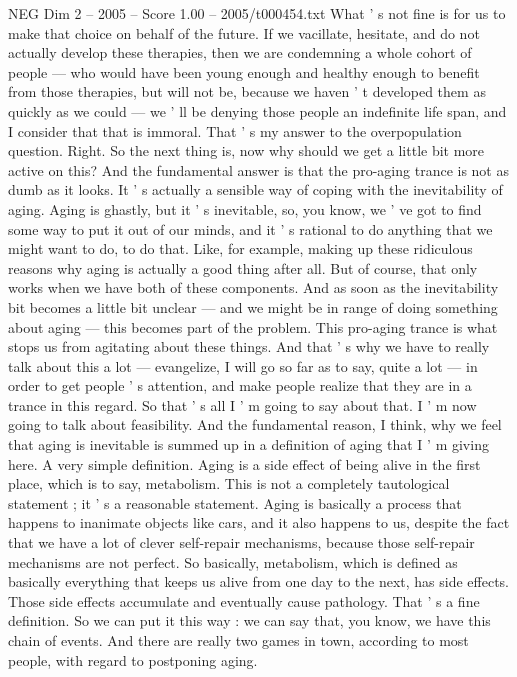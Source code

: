 \begin{textsample}{NEG Dim 2 – 2005 – Score 1.00 – 2005/t000454.txt}
What ' s not fine is for us to make that choice on behalf of the future.
If we vacillate, hesitate, and do not actually develop these therapies, then we are condemning a whole cohort of people — who would have been young enough and healthy enough to benefit from those therapies, but will not be, because we haven ' t developed them as quickly as we could — we ' ll be denying those people an indefinite life span, and I consider that that is immoral.
That ' s my answer to the overpopulation question.
Right.
So the next thing is, now why should we get a little bit more active on this?
And the fundamental answer is that the pro-aging trance is not as dumb as it looks.
It ' s actually a sensible way of coping with the inevitability of aging.
Aging is ghastly, but it ' s inevitable, so, you know, we ' ve got to find some way to put it out of our minds, and it ' s rational to do anything that we might want to do, to do that.
Like, for example, making up these ridiculous reasons why aging is actually a good thing after all.
But of course, that only works when we have both of these components.
And as soon as the inevitability bit becomes a little bit unclear — and we might be in range of doing something about aging — this becomes part of the problem.
This pro-aging trance is what stops us from agitating about these things.
And that ' s why we have to really talk about this a lot — evangelize, I will go so far as to say, quite a lot — in order to get people ' s attention, and make people realize that they are in a trance in this regard.
So that ' s all I ' m going to say about that.
I ' m now going to talk about feasibility.
And the fundamental reason, I think, why we feel that aging is inevitable is summed up in a definition of aging that I ' m giving here.
A very simple definition.
Aging is a side effect of being alive in the first place, which is to say, metabolism.
This is not a completely tautological statement ; it ' s a reasonable statement.
Aging is basically a process that happens to inanimate objects like cars, and it also happens to us, despite the fact that we have a lot of clever self-repair mechanisms, because those self-repair mechanisms are not perfect.
So basically, metabolism, which is defined as basically everything that keeps us alive from one day to the next, has side effects.
Those side effects accumulate and eventually cause pathology.
That ' s a fine definition.
So we can put it this way : we can say that, you know, we have this chain of events.
And there are really two games in town, according to most people, with regard to postponing aging.

\end{textsample}
